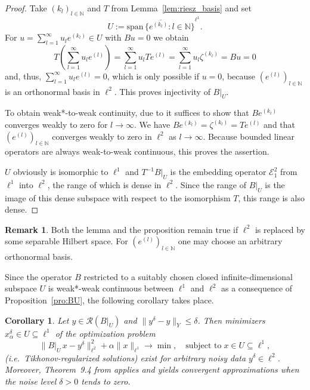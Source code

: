 \documentclass[12pt,twoside,reqno]{amsart}
\newtheorem{corollary}[theorem]{Corollary}
\theoremstyle{definition}
\newtheorem{remark}[theorem]{Remark}
\numberwithin{equation}{section}
\begin{document}
\begin{proof}
Take $(k_l)_{l\in\mathbb{N}}$ and $T$ from Lemma~\ref{lem:riesz_basis} and set
\begin{equation}\label{eq:span}
U:=\overline{\mathrm{span}\,\{e^{(k_l)}:l\in\mathbb{N}\}}^{\ell^1}.
\end{equation}
For $u=\sum_{l=1}^\infty u_l e^{(k_l)}\in U$ with $Bu=0$ we obtain
\begin{equation}
T\left(\sum_{l=1}^\infty u_l e^{(l)}\right)
=\sum_{l=1}^\infty u_l Te^{(l)}
=\sum_{l=1}^\infty u_l \zeta^{(k_l)}
=Bu=0
\end{equation}
and, thus, $\sum_{l=1}^\infty u_l e^{(l)}=0$, which is only possible if $u=0$, because $(e^{(l)})_{l\in\mathbb{N}}$ is an orthonormal basis in $\ell^2$. This proves injectivity of $B|_U$.
\par
To obtain weak*-to-weak continuity, due to \cite[Lemma~9.3]{Flemmingbuch18} it suffices to show that $Be^{(k_l)}$ converges weakly to zero for $l\to\infty$. We have $Be^{(k_l)}=\zeta^{(k_l)}=Te^{(l)}$ and that $(e^{(l)})_{l\in\mathbb{N}}$ converges weakly to zero in $\ell^2$ as $l \to \infty$. Because bounded linear operators are always  weak-to-weak continuous, this proves the assertion.
\par
$U$ obviously is isomorphic to $\ell^1$ and $T^{-1}B|_U$ is the embedding operator $\mathcal{E}_1^2$ from $\ell^1$ into $\ell^2$, the range of which is dense in $\ell^2$. Since the range of $B|_U$ is the image of this dense subspace with respect to the isomorphism $T$, this range is also dense.
\end{proof}

\begin{remark}
Both the lemma and the proposition remain true if $\ell^2$ is replaced by some separable Hilbert space. For $(e^{(l)})_{l\in\mathbb{N}}$ one may choose an arbitrary orthonormal basis.
\end{remark}



Since the operator $B$ restricted to a suitably chosen closed infinite-dimensional subspace $U$ is weak*-weak continuous between $\ell^1$ and $\ell^2$ as a consequence of Proposition~\ref{pro:BU},
the following corollary takes place.

\begin{corollary} \label{cor:Tik}
Let $y \in \mathcal{R}(B|_U)$ and $\|y^\delta-y\|_Y \le \delta$. Then minimizers $x_\alpha^\delta \in U \subseteq \ell^1$ of the optimization problem
\begin{equation} \label{eq:BU}
 \|B|_U\, x-y^\delta\|^2_{\ell^2}+\alpha \|x\|_{\ell^1} \to \min, \quad \mbox{subject to} \; x \in U \subseteq \ell^1,
\end{equation}
(i.e.~Tikhonov-regularized solutions) exist for arbitrary noisy data $y^\delta\in\ell^2$. Moreover, Theorem~9.4 from \cite{Flemmingbuch18} applies and yields convergent approximations when the noise level $\delta>0$ tends to zero.
\end{corollary}
\end{document}
